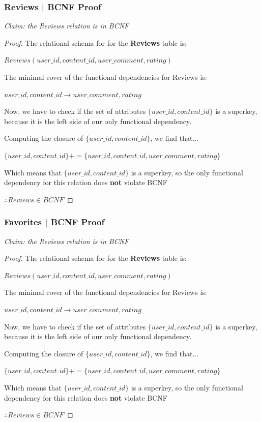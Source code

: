 \documentclass[letter, 12pt, titlepage]{article}
\begin{document}
		\subsubsection{Reviews | BCNF Proof }
		

		\textit{Claim: the Reviews relation is in BCNF}


		\begin{proof}


		The relational schema for for the \textbf{Reviews} table is:


		$Reviews(user\_id, content\_id, user\_comment, rating)$


		The minimal cover of the functional dependencies for Reviews is:


		$ user\_id, content\_id \rightarrow user\_comment, rating $


		Now, we have to check if the set of attributes  $\{user\_id, content\_id\}$ is a superkey, because it is the left side of our only functional dependency.
		

		Computing the closure of $\{user\_id, content\_id\}$, we find that...

		$\{user\_id, content\_id\}+ = \{user\_id, content\_id, user\_comment, rating\} $

		Which means that $\{user\_id, content\_id\}$ is a superkey, so the only functional dependency for this relation does \textbf{not} violate BCNF

		$\therefore Reviews \in BCNF $	
		\end{proof}


	\subsubsection{Favorites | BCNF Proof }

		

		\textit{Claim: the Reviews relation is in BCNF}


		\begin{proof}


		The relational schema for for the \textbf{Reviews} table is:


		$Reviews(user\_id, content\_id, user\_comment, rating)$


		The minimal cover of the functional dependencies for Reviews is:


		$ user\_id, content\_id \rightarrow user\_comment, rating $


			Now, we have to check if the set of attributes  $\{user\_id, content\_id\}$ is a superkey, because it is the left side of our only functional dependency.
		

			Computing the closure of $\{user\_id, content\_id\}$, we find that...

		$\{user\_id, content\_id\}+ = \{user\_id, content\_id, user\_comment, rating\} $

		Which means that $\{user\_id, content\_id\}$ is a superkey, so the only functional dependency for this relation does \textbf{not} violate BCNF

		$\therefore Reviews \in BCNF $	
		\end{proof}
\end{document}
